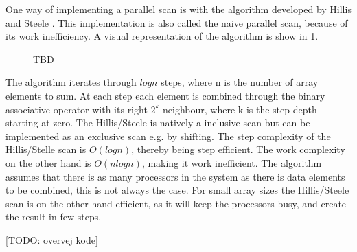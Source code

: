 One way of implementing a parallel scan is with the algorithm developed by Hillis and Steele \cite{Hillis:1986:DPA:7902.7903}. This implementation is also called the naive parallel scan, because of its work inefficiency. A visual representation of the algorithm is show in \cref{fig:scan_hillis_steele}. 

\begin{figure}[ht]
	\centering
	\caption{TBD}
	\label{fig:scan_hillis_steele}
\end{figure}

The algorithm iterates through $log n$ steps, where n is the number of array elements to sum. At each step each element is combined through the binary associative operator with its right $ 2^k $ neighbour, where k is the step depth starting at zero. The Hillis/Steele is natively a inclusive scan but can be implemented as an exclusive scan e.g. by shifting. The step complexity of the Hillis/Stelle scan is $O(log n)$, thereby being step efficient. The work complexity on the other hand is $O(n log n)$, making it work inefficient. The algorithm assumes that there is as many processors in the system as there is data elements to be combined, this is not always the case. For small array sizes the Hillis/Steele scan is on the other hand efficient, as it will keep the processors busy, and create the result in few steps. 

[TODO: overvej kode]  